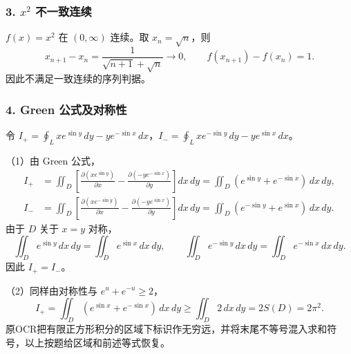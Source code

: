 \documentclass[11pt,fontset=fandol]{ctexart}
\begin{document}
\subsubsection{\texorpdfstring{3. \(x^2\)
不一致连续}{3. x\^{}2 不一致连续}}\label{x2-ux4e0dux4e00ux81f4ux8fdeux7eed}

\(f(x)=x^2\) 在 \((0,\infty)\) 连续。取 \(x_n=\sqrt n\)，则 \[
x_{n+1}-x_n=\frac1{\sqrt{n+1}+\sqrt n}\to0,
\qquad f(x_{n+1})-f(x_n)=1.
\] 因此不满足一致连续的序列判据。

\subsubsection{4. Green
公式及对称性}\label{green-ux516cux5f0fux53caux5bf9ux79f0ux6027}

令
\(I_+=\oint_Lxe^{\sin y}\,dy-ye^{-\sin x}\,dx\)，\(I_-=\oint_Lxe^{-\sin y}\,dy-ye^{\sin x}\,dx\)。

（1）由 Green 公式， \[
\begin{aligned}
I_+&=\iint_D\left[\frac{\partial(xe^{\sin y})}{\partial x}-\frac{\partial(-ye^{-\sin x})}{\partial y}\right]dx\,dy
=\iint_D(e^{\sin y}+e^{-\sin x})\,dx\,dy,\\
I_-&=\iint_D\left[\frac{\partial(xe^{-\sin y})}{\partial x}-\frac{\partial(-ye^{\sin x})}{\partial y}\right]dx\,dy
=\iint_D(e^{-\sin y}+e^{\sin x})\,dx\,dy.
\end{aligned}
\] 由于 \(D\) 关于 \(x=y\) 对称， \[
\iint_De^{\sin y}\,dx\,dy=\iint_De^{\sin x}\,dx\,dy,\qquad
\iint_De^{-\sin y}\,dx\,dy=\iint_De^{-\sin x}\,dx\,dy.
\] 因此 \(I_+=I_-\)。

（2）同样由对称性与 \(e^u+e^{-u}\ge2\)， \[
I_+=\iint_D(e^{\sin x}+e^{-\sin x})\,dx\,dy
\ge\iint_D2\,dx\,dy=2S(D)=2\pi^2.
\]
原OCR把有限正方形积分的区域下标识作无穷远，并将末尾不等号混入求和符号，以上按题给区域和前述等式恢复。
\end{document}
